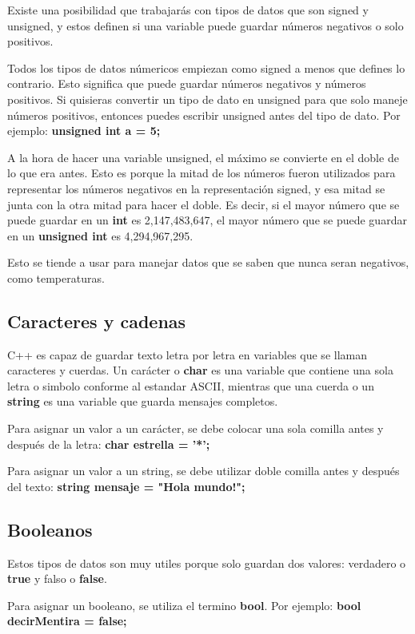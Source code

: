 \documentclass{article}
\begin{document}
Existe una posibilidad que trabajarás con tipos de datos que son signed y unsigned, y estos definen si una variable puede guardar números negativos o solo positivos.

Todos los tipos de datos númericos empiezan como signed a menos que defines lo contrario. Esto significa que puede guardar números negativos y números positivos. Si quisieras convertir un tipo de dato en unsigned para que solo maneje números positivos, entonces puedes escribir unsigned antes del tipo de dato. Por ejemplo: \textbf{unsigned int a = 5;}

A la hora de hacer una variable unsigned, el máximo se convierte en el doble de lo que era antes. Esto es porque la mitad de los números fueron utilizados para representar los números negativos en la representación signed, y esa mitad se junta con la otra mitad para hacer el doble. Es decir, si el mayor número que se puede guardar en un \textbf{int} es 2,147,483,647, el mayor número que se puede guardar en un \textbf{unsigned int} es 4,294,967,295.

Esto se tiende a usar para manejar datos que se saben que nunca seran negativos, como temperaturas.

\subsection{Caracteres y cadenas}

C++ es capaz de guardar texto letra por letra en variables que se llaman caracteres y cuerdas. Un carácter o \textbf{char} es una variable que contiene una sola letra o simbolo conforme al estandar ASCII, mientras que una cuerda o un \textbf{string} es una variable que guarda mensajes completos.

Para asignar un valor a un carácter, se debe colocar una sola comilla antes y después de la letra: \textbf{char estrella = '*';}

Para asignar un valor a un string, se debe utilizar doble comilla antes y después del texto: \textbf{string mensaje = "Hola mundo!";}

\subsection{Booleanos}

Estos tipos de datos son muy utiles porque solo guardan dos valores: verdadero o \textbf{true} y falso o \textbf{false}.

Para asignar un booleano, se utiliza el termino \textbf{bool}. Por ejemplo: \textbf{bool decirMentira = false;}
\end{document}

